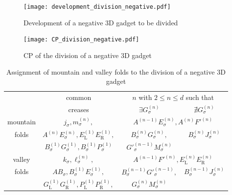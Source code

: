 \documentclass[11pt]{amsart}
\numberwithin{equation}{section}
\numberwithin{theorem}{section}
\newcommand{\Lt}{\ensuremath{\mathrm{L}}}
\newcommand{\Rt}{\ensuremath{\mathrm{R}}}
\begin{document}
\begin{figure}[htbp]
\addtocounter{theorem}{1}
\centering\texttt{[image: development\_division\_negative.pdf]}
\caption{Development of a negative $3$D gadget to be divided}
\label{fig:development_division_negative}
\end{figure}
\begin{figure}[htbp]
\addtocounter{theorem}{1}
\centering\texttt{[image: CP\_division\_negative.pdf]}
\caption{CP of the division of a negative $3$D gadget}
\label{fig:CP_division_negative}
\end{figure}
\addtocounter{theorem}{1}
\begin{table}[h]
\begin{tabular}{c|c|c|c}
&common&\multicolumn{2}{c}{$n$ with $2\leqslant n\leqslant d$ such that}\\
\cline{3-4}&creases&$\exists G_\sigma^{(n)}$&$\nexists G_\sigma^{(n)}$\\
\hline mountain&$j_\sigma ,m_\sigma^{(n)},$&\multicolumn{2}{c}{$A^{(n-1)}E_\sigma^{(n)},A^{(n)}{F'}^{(n)}$}\\
\cline{3-4}folds&$A^{(n)}E_\sigma^{(n)},E_\Lt^{(1)}E_\Rt^{(1)},$&$B_\sigma^{(n)}G_\sigma^{(n)},$&$B_\sigma^{(n)}J_\sigma^{(n)}$\\
&$B_\sigma^{(1)}G_\sigma^{(1)},B_\sigma^{(1)}P_\sigma^{(1)}$&${G'}_\sigma^{(n-1)}M_\sigma^{(n)}$&\\
\hline valley&$k_\sigma ,\ell_\sigma^{(n)},$&\multicolumn{2}{c}{$A^{(n-1)}{F'}^{(n)}, E_\Lt^{(n)}E_\Rt^{(n)}$}\\
\cline{3-4}folds&$AB_\sigma ,B_\sigma^{(1)}E_\sigma^{(1)},$&$B_\sigma^{(n-1)}{G'}_\sigma^{(n-1)},$&$B_\sigma^{(n-1)}J_\sigma^{(n)}$\\
&$G_\Lt^{(1)}G_\Rt^{(1)},P_\Lt^{(1)}P_\Rt^{(1)},$&$G_\sigma^{(n)}M_\sigma^{(n)}$&
\end{tabular}\vspace{0.5cm}
\caption{Assignment of mountain and valley folds to the division of a negative $3$D gadget}
\label{tbl:assignment_division_negative}
\end{table}
\end{document}
